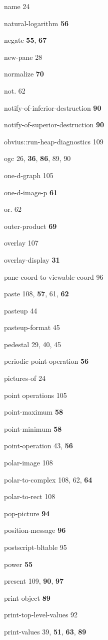 \begin{theindex}
\item name 24
\item natural-logarithm {\bf 56}
\item negate {\bf 55}, {\bf 67}
\item new-pane 28
\item normalize {\bf 70}
\item not. 62
\item notify-of-inferior-destruction {\bf 90}
\item notify-of-superior-destruction {\bf 90}
\item obvius::run-heap-diagnostics 109
\item ogc 26, {\bf 36}, {\bf 86}, 89, 90
\item one-d-graph 105
\item one-d-image-p {\bf 61}
\item or. 62
\item outer-product {\bf 69}
\item overlay 107
\item overlay-display {\bf 31}
\item pane-coord-to-viewable-coord 96
\item paste 108, {\bf 57}, 61, {\bf 62}
\item pasteup 44
\item pasteup-format 45
\item pedestal 29, 40, 45
\item periodic-point-operation {\bf 56}
\item pictures-of 24
\item point operations 105
\item point-maximum {\bf 58}
\item point-minimum {\bf 58}
\item point-operation 43, {\bf 56}
\item polar-image 108
\item polar-to-complex 108, 62, {\bf 64}
\item polar-to-rect 108
\item pop-picture {\bf 94}
\item position-message {\bf 96}
\item postscript-bltable 95
\item power {\bf 55}
\item present 109, {\bf 90}, {\bf 97}
\item print-object {\bf 89}
\item print-top-level-values 92
\item print-values 39, {\bf 51}, {\bf 63}, {\bf 89}

\end{theindex}
